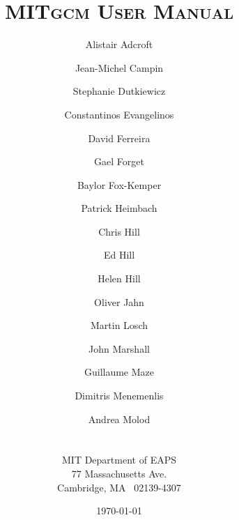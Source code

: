 \documentclass[10pt]{book}
\begin{document}

\title{ \textsc{MITgcm User Manual} }

\author{
  Alistair Adcroft \and Jean-Michel Campin \and Stephanie Dutkiewicz
  \and Constantinos Evangelinos \and David Ferreira %
  \and Gael Forget \and Baylor Fox-Kemper \and Patrick Heimbach 
  \and Chris Hill \and Ed Hill \and Helen Hill 
  \and Oliver Jahn \and Martin Losch \and John Marshall
  \and Guillaume Maze \and Dimitris Menemenlis \and Andrea Molod
  \\
  \\
  \\
  MIT Department of EAPS  \\
  77 Massachusetts Ave. \\
  Cambridge, MA \ 02139-4307
}

\date{\today}

\maketitle

\tableofcontents

























\end{document}
